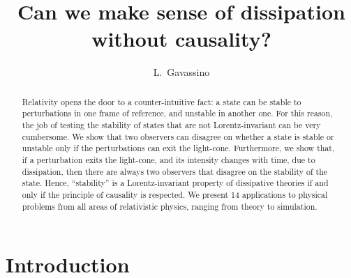 \documentclass[a4paper, amsfonts, amssymb, amsmath, reprint, showkeys,  twoside, onecolumn,notitlepage,nofootinbib]{revtex4-1}
\theoremstyle{definition}
\theoremstyle{theorem}
\begin{document}
\title{Can we make sense of dissipation without causality?}
\author{L.~Gavassino}



\begin{abstract}
Relativity opens the door to a counter-intuitive fact: a state can be stable to perturbations in one frame of reference, and unstable in another one. For this reason, the job of testing the stability of states that are not Lorentz-invariant can be very cumbersome. We show that two observers can disagree on whether a state is stable or unstable only if the perturbations can exit the light-cone. Furthermore, we show that, if a perturbation exits the light-cone, and its intensity changes with time, due to dissipation, then there are always two observers that disagree on the stability of the state. Hence, ``stability'' is a Lorentz-invariant property of dissipative theories if and only if the principle of causality is respected. We present 14 applications to physical problems from all areas of relativistic physics, ranging from theory to simulation.
\end{abstract} 



\maketitle



\section{Introduction}
\end{document}
